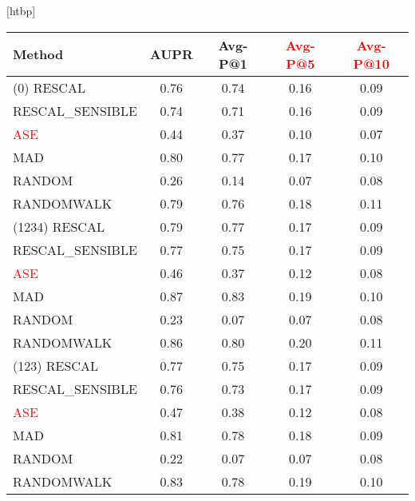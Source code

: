 \documentclass{tufte-handout}
\makeatletter
\newcommand{\alert}[1]{\textcolor{red}{#1}}
\renewenvironment{table}[1][htbp]{%
\@tufte@orig@float{table}[#1]}{%
\@tufte@orig@endfloat}%
\makeatother
\begin{document}
\begin{table}
  \centering
  \begin{tabular}{l c c c c}
    Method           & AUPR & Avg-P@1 & \alert{Avg-P@5} & \alert{Avg-P@10} \\\toprule
    (0) RESCAL       & 0.76 & 0.74    & 0.16            & 0.09             \\
    RESCAL\_SENSIBLE & 0.74 & 0.71    & 0.16            & 0.09             \\
    \alert{ASE}      & 0.44 & 0.37    & 0.10            & 0.07             \\
    MAD              & 0.80 & 0.77    & 0.17            & 0.10             \\
    RANDOM           & 0.26 & 0.14    & 0.07            & 0.08             \\
    RANDOMWALK       & 0.79 & 0.76    & 0.18            & 0.11             \\\midrule
    (1234) RESCAL    & 0.79 & 0.77    & 0.17            & 0.09             \\
    RESCAL\_SENSIBLE & 0.77 & 0.75    & 0.17            & 0.09             \\
    \alert{ASE}      & 0.46 & 0.37    & 0.12            & 0.08             \\
    MAD              & 0.87 & 0.83    & 0.19            & 0.10             \\
    RANDOM           & 0.23 & 0.07    & 0.07            & 0.08             \\
    RANDOMWALK       & 0.86 & 0.80    & 0.20            & 0.11             \\\midrule
    (123) RESCAL     & 0.77 & 0.75    & 0.17            & 0.09             \\
    RESCAL\_SENSIBLE & 0.76 & 0.73    & 0.17            & 0.09             \\
    \alert{ASE}      & 0.47 & 0.38    & 0.12            & 0.08             \\
    MAD              & 0.81 & 0.78    & 0.18            & 0.09             \\
    RANDOM           & 0.22 & 0.07    & 0.07            & 0.08             \\
    RANDOMWALK       & 0.83 & 0.78    & 0.19            & 0.10             \\
  \end{tabular}
  \caption{Performance vs Algorithm On the US Presidents Dataset. The two sections are two monte-carlo runs.
    \alert{In this dataset P@5, P@10 don't make a lot of sense since there are only at most 1, 2 or 3 correct answers.}}
  \label{tab:perf-vs-algo-on-us-president}
\end{table}
\end{document}
